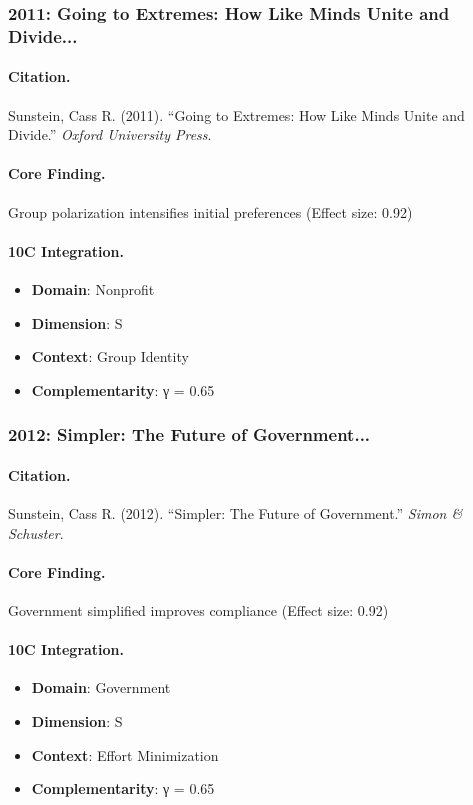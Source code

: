 \subsubsection{2011: Going to Extremes: How Like Minds Unite and Divide...}

\paragraph{Citation.}
Sunstein, Cass R. (2011). ``Going to Extremes: How Like Minds Unite and Divide.''
\textit{Oxford University Press}.

\paragraph{Core Finding.}
Group polarization intensifies initial preferences (Effect size: 0.92)

\paragraph{10C Integration.}
\begin{itemize}[nosep]
  \item \textbf{Domain}: Nonprofit
  \item \textbf{Dimension}: S
  \item \textbf{Context}: Group Identity
  \item \textbf{Complementarity}: γ = 0.65
\end{itemize}

\subsubsection{2012: Simpler: The Future of Government...}

\paragraph{Citation.}
Sunstein, Cass R. (2012). ``Simpler: The Future of Government.''
\textit{Simon & Schuster}.

\paragraph{Core Finding.}
Government simplified improves compliance (Effect size: 0.92)

\paragraph{10C Integration.}
\begin{itemize}[nosep]
  \item \textbf{Domain}: Government
  \item \textbf{Dimension}: S
  \item \textbf{Context}: Effort Minimization
  \item \textbf{Complementarity}: γ = 0.65
\end{itemize}

